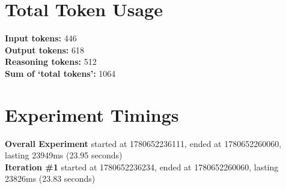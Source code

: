\documentclass{article}
\begin{document}
\section*{Total Token Usage}
\textbf{Input tokens: }446
\\\textbf{Output tokens: }618
\\\textbf{Reasoning tokens: }512
\\\textbf{Sum of `total tokens': }1064
\section*{Experiment Timings}
\textbf{Overall Experiment} started at 1780652236111, ended at 1780652260060, lasting 23949ms (23.95 seconds)
\\\textbf{Iteration \#1} started at 1780652236234, ended at 1780652260060, lasting 23826ms (23.83 seconds)
\end{document}
